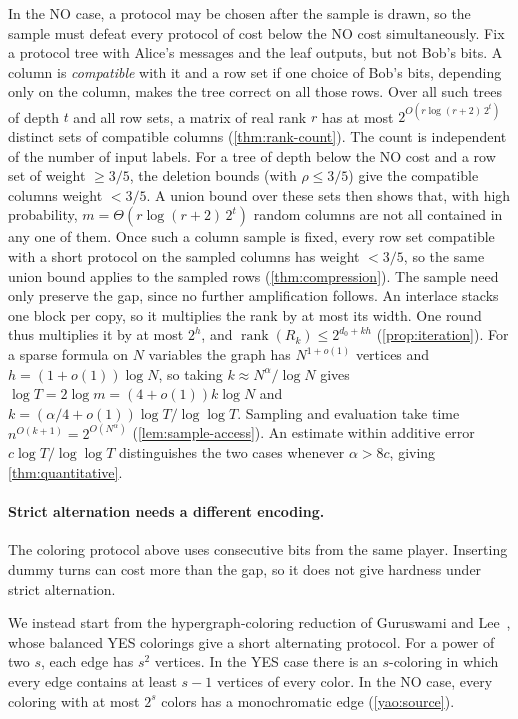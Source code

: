 \documentclass[11pt,letterpaper]{article} \usepackage[utf8]{inputenc}
\theoremstyle{plain} \newtheorem{theorem}{Theorem}[section]
\theoremstyle{definition} \newaliascnt{definition}{theorem}
\DeclareMathOperator{\rank}{rank} \crefname{claim}{Claim}{Claims}
\begin{document}
In the NO case, a protocol may be chosen after the sample is drawn, so the
sample must defeat every protocol of cost below the NO cost
simultaneously. Fix a protocol tree with Alice's messages and the leaf
outputs, but not Bob's bits. A column is \emph{compatible} with it and a
row set if one choice of Bob's bits, depending only on the column, makes
the tree correct on all those rows.
Over all such trees of
depth $t$ and all row sets, a matrix of real rank $r$ has at most
$2^{O(r\log(r+2)\,2^t)}$ distinct sets of compatible columns
(\cref{thm:rank-count}). The count is independent of the number of input labels.
For a tree of depth below the NO cost and a row set of weight $\ge3/5$,
the deletion bounds (with $\rho\le3/5$) give the compatible columns weight $<3/5$. A union
bound over these sets then shows that, with high probability,
$m=\Theta(r\log(r+2)\,2^t)$ random columns are not all contained in any
one of them. Once such a column sample is fixed, every row set compatible
with a short protocol on the sampled columns has weight $<3/5$, so the same
union bound applies to the sampled rows (\cref{thm:compression}). The
sample need only preserve the gap, since no further amplification follows. An interlace stacks one block per copy, so it multiplies the rank
by at most its width. One round thus multiplies it by at most $2^h$, and
$\rank(R_k)\le2^{d_0+kh}$ (\cref{prop:iteration}). For a sparse formula on $N$ variables the graph has
$N^{1+o(1)}$ vertices and $h=(1+o(1))\log N$,
so taking $k\approx N^\alpha/\log N$ gives
$\log T=2\log m=(4+o(1))k\log N$ and
$k=(\alpha/4+o(1))\log T/\log\log T$.
Sampling and evaluation take time $n^{O(k+1)}=2^{O(N^\alpha)}$
(\cref{lem:sample-access}).
An estimate within additive error $c\log T/\log\log T$ distinguishes the
two cases whenever $\alpha>8c$, giving \cref{thm:quantitative}.

\paragraph{Strict alternation needs a different encoding.}
The coloring protocol above uses consecutive bits from the same player.
Inserting dummy turns can cost more than the gap, so it does not give
hardness under strict alternation.

We instead start from the hypergraph-coloring reduction of Guruswami and
Lee~\cite{guruswami2018balanced}, whose balanced YES colorings give a
short alternating protocol. For a power of two $s$, each edge has
$s^2$ vertices. In the YES case there is an $s$-coloring in which every
edge contains at least $s-1$ vertices of every color. In the NO case,
every coloring with at most $2^s$ colors has a monochromatic edge
(\cref{yao:source}).
\end{document}
